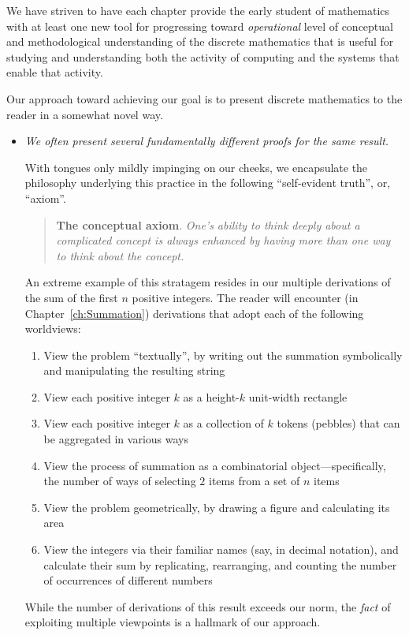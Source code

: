 We have striven to have each chapter provide the early student of
mathematics with at least one new tool for progressing toward {\em
  operational} level of conceptual and methodological understanding of
the discrete mathematics that is useful for studying and understanding
both the activity of computing and the systems that enable that
activity.

Our approach toward achieving our goal is to present discrete
mathematics to the reader in a somewhat novel way.
\begin{itemize}
\item
{\em We often present several fundamentally different proofs for the
  same result.}

With tongues only mildly impinging on our cheeks, we encapsulate the
philosophy underlying this practice in the following ``self-evident
truth'', or, ``axiom''.  
\begin{quote}
{\bf The conceptual axiom}.
{\em
One's ability to think deeply about a complicated concept is always
enhanced by having more than one way to think about the concept.}
\end{quote}

An extreme example of this stratagem resides in our multiple
derivations of the sum of the first $n$ positive integers.  The reader
will encounter (in Chapter~\ref{ch:Summation}) derivations that adopt
each of the following worldviews:
  \begin{enumerate}
    \item
View the problem ``textually'', by writing out the summation
symbolically and manipulating the resulting string
  \item
View each positive integer $k$ as a height-$k$ unit-width rectangle
  \item
View each positive integer $k$ as a collection of $k$ tokens (pebbles)
that can be aggregated in various ways
  \item
View the process of summation as a combinatorial
object---specifically, the number of ways of selecting $2$ items from
a set of $n$ items
  \item
View the problem geometrically, by drawing a figure and calculating
its area
  \item
View the integers via their familiar names (say, in decimal notation),
and calculate their sum by replicating, rearranging, and counting the
number of occurrences of different numbers
  \end{enumerate}
While the number of derivations of this result exceeds our norm, the
{\em fact} of exploiting multiple viewpoints is a hallmark of our
approach.


\end{itemize}
